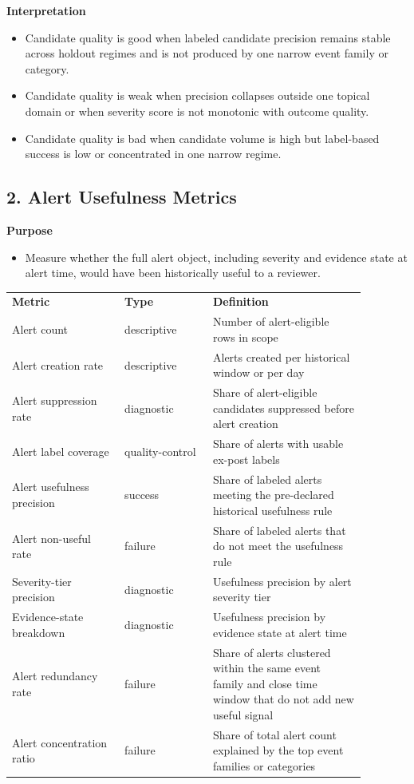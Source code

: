 \documentclass{article}
\begin{document}
\textbf{Interpretation}
\begin{itemize}
\item Candidate quality is good when labeled candidate precision remains stable across holdout regimes and is not produced by one narrow event family or category.
\item Candidate quality is weak when precision collapses outside one topical domain or when severity score is not monotonic with outcome quality.
\item Candidate quality is bad when candidate volume is high but label-based success is low or concentrated in one narrow regime.
\end{itemize}

\subsection*{2. Alert Usefulness Metrics}

\textbf{Purpose}
\begin{itemize}
\item Measure whether the full alert object, including severity and evidence state at alert time, would have been historically useful to a reviewer.
\end{itemize}

\begin{longtable}{p{0.28\linewidth}p{0.22\linewidth}p{0.38\linewidth}}
\textbf{Metric} & \textbf{Type} & \textbf{Definition} \\
Alert count & descriptive & Number of alert-eligible rows in scope \\
Alert creation rate & descriptive & Alerts created per historical window or per day \\
Alert suppression rate & diagnostic & Share of alert-eligible candidates suppressed before alert creation \\
Alert label coverage & quality-control & Share of alerts with usable ex-post labels \\
Alert usefulness precision & success & Share of labeled alerts meeting the pre-declared historical usefulness rule \\
Alert non-useful rate & failure & Share of labeled alerts that do not meet the usefulness rule \\
Severity-tier precision & diagnostic & Usefulness precision by alert severity tier \\
Evidence-state breakdown & diagnostic & Usefulness precision by evidence state at alert time \\
Alert redundancy rate & failure & Share of alerts clustered within the same event family and close time window that do not add new useful signal \\
Alert concentration ratio & failure & Share of total alert count explained by the top event families or categories \\
\end{longtable}
\end{document}
